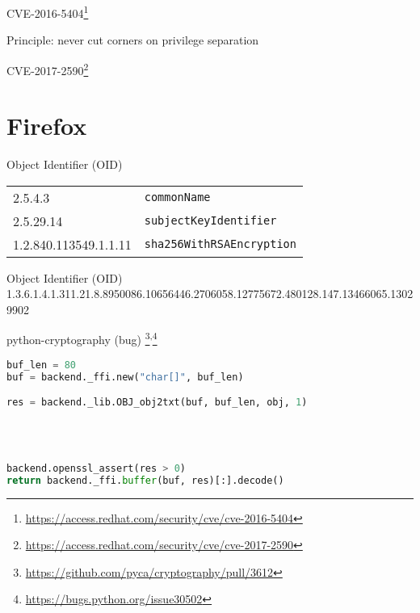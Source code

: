 \documentclass[ignorenonframetext,aspectratio=169,dvipsnames]{beamer}
\begin{document}
\begin{frame}[plain]
\huge
  CVE-2016-5404\footnote[frame]{
    \url{https://access.redhat.com/security/cve/cve-2016-5404}}
\end{frame}

\begin{frame}[plain]
\huge
Principle: never cut corners on privilege separation
\end{frame}


\begin{frame}[plain]
\huge
  CVE-2017-2590\footnote[frame]{
    \url{https://access.redhat.com/security/cve/cve-2017-2590}}
\end{frame}







\section{Firefox}\label{firefox}


\begin{frame}{Object Identifier (OID)}
\Large
  \begin{tabular}{l l}
    2.5.4.3 & {\tt commonName} \\
    2.5.29.14 & {\tt subjectKeyIdentifier} \\
    1.2.840.113549.1.1.11 & {\tt sha256WithRSAEncryption} \\
  \end{tabular}
\end{frame}

\begin{frame}{Object Identifier (OID)}
  1.3.6.1.4.1.311.21.8.8950086.10656446.2706058.12775672.480128.147.13466065.13029902
\end{frame}

\begin{frame}[fragile]{python-cryptography (bug)
  \footnote[frame]{
    \url{https://github.com/pyca/cryptography/pull/3612}
  }\textsuperscript{,}\footnote[frame]{
    \url{https://bugs.python.org/issue30502}
  }
}
\begin{lstlisting}[language=Python]
buf_len = 80
buf = backend._ffi.new("char[]", buf_len)

res = backend._lib.OBJ_obj2txt(buf, buf_len, obj, 1)




backend.openssl_assert(res > 0)
return backend._ffi.buffer(buf, res)[:].decode()
\end{lstlisting}
\end{frame}
\end{document}
